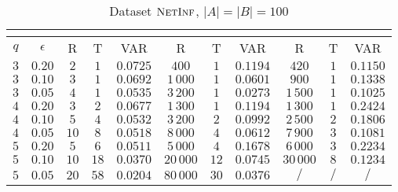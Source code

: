 	\begin{table}[h]
		\centering
		\begin{tabular}{|c|c|c|c|c|c|c|c|c|c|c|}
			\cline{3-11}
			\multicolumn{2}{c|}{} & \multicolumn{3}{c|}{\fcount} & \multicolumn{3}{c|}{\fsamp} & \multicolumn{3}{c|}{\base}\\
			\hline	
			$q$ & $\epsilon$ & R    & T & VAR          &  R        & T & VAR   &        R & T & VAR    \\ \hline
			$3$ & $0.20$     &  $2$ & $1$  & $0.0725$ &     $400$ &  $1$ & $0.1194$ &     $420$ & $1$  & $0.1150$   \\ \hline
			$3$ & $0.10$     &  $3$ & $1$  & $0.0692$ &  $1\,000$ &  $1$ & $0.0601$ &     $900$ & $1$  & $0.1338$   \\ \hline
			$3$ & $0.05$     &  $4$ & $1$  & $0.0535$ &  $3\,200$ &  $1$ & $0.0273$ &  $1\,500$ & $1$  & $0.1025$   \\ \hline
		 	\hline
			$4$ & $0.20$     &  $3$ & $2$  & $0.0677$ &  $1\,300$ &  $1$ & $0.1194$ &  $1\,300$ & $1$  & $0.2424$   \\ \hline
			$4$ & $0.10$     &  $5$ & $4$  & $0.0532$ &  $3\,200$ &  $2$ & $0.0992$ &  $2\,500$ & $2$  & $0.1806$   \\ \hline
			$4$ & $0.05$     & $10$ & $8$  & $0.0518$ &  $8\,000$ &  $4$ & $0.0612$ &  $7\,900$ & $3$  & $0.1081$   \\ \hline
			\hline
			$5$ & $0.20$     &  $5$ & $6$  & $0.0511$ &  $5\,000$ &  $4$ & $0.1678$ &  $6\,000$ & $3$  & $0.2234$   \\ \hline
			$5$ & $0.10$     & $10$ & $18$ & $0.0370$ & $20\,000$ & $12$ & $0.0745$ & $30\,000$ & $8$  & $0.1234$   \\ \hline
			$5$ & $0.05$     & $20$ & $58$ & $0.0204$ & $80\,000$ & $30$ & $0.0376$ &       $/$ & $/$  & $/$   \\ \hline

		\end{tabular}
		\caption{Dataset $\textsc{NetInf}$, $|A| = |B| = 100$}
	\end{table}
	
